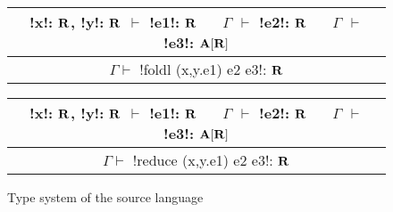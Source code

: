 \begin{figure*}[tb]
    \begin{tabular}{c}
        !x!: $\mathbf{R}$, !y!: $\mathbf{R}$ $\vdash$ !e1!: $\mathbf{R}$ 
        $\quad$ $\Gamma$ $\vdash$ !e2!: $\mathbf{R}$
        $\quad$ $\Gamma$ $\vdash$ !e3!: $\mathbf{A}[\mathbf{R}]$
        \\\hline  
        $\Gamma \vdash$ !foldl (x,y.e1) e2 e3!: $\mathbf{R}$
    \end{tabular}

    \begin{tabular}{c}
        !x!: $\mathbf{R}$, !y!: $\mathbf{R}$ $\vdash$ !e1!: $\mathbf{R}$ 
        $\quad$ $\Gamma$ $\vdash$ !e2!: $\mathbf{R}$
        $\quad$ $\Gamma$ $\vdash$ !e3!: $\mathbf{A}[\mathbf{R}]$
        \\\hline  
        $\Gamma \vdash$ !reduce (x,y.e1) e2 e3!: $\mathbf{R}$
    \end{tabular}
    \vspace{-0.2cm}
    \caption{Type system of the source language}
    \vspace{-0.4cm}
    \label{fig:source_typesystem}
    \end{figure*}